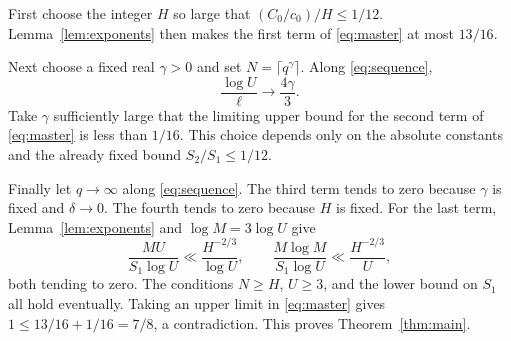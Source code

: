 \documentclass[11pt,a4paper]{amsart}
\theoremstyle{remark}
\numberwithin{equation}{section}
\begin{document}
First choose the integer $H$ so large that
$(C_0/c_0)/H\le1/12$. Lemma~\ref{lem:exponents} then makes the
first term of \eqref{eq:master} at most $13/16$.

Next choose a fixed real $\gamma>0$ and set
$N=\lceil q^\gamma\rceil$. Along \eqref{eq:sequence},
\[
 \frac{\log U}{\ell}\longrightarrow\frac{4\gamma}{3}.
\]
Take $\gamma$ sufficiently large that the limiting upper bound
for the second term of \eqref{eq:master} is less than $1/16$.
This choice depends only on the absolute constants and the already
fixed bound $S_2/S_1\le1/12$.

Finally let $q\to\infty$ along \eqref{eq:sequence}. The third term
tends to zero because $\gamma$ is fixed and $\delta\to0$.
The fourth tends to zero because $H$ is fixed. For the last term,
Lemma~\ref{lem:exponents} and $\log M=3\log U$ give
\[
 \frac{MU}{S_1\log U}\ll\frac{H^{-2/3}}{\log U},
 \qquad
 \frac{M\log M}{S_1\log U}\ll\frac{H^{-2/3}}{U},
\]
both tending to zero. The conditions $N\ge H$, $U\ge3$, and
the lower bound on $S_1$ all hold eventually. Taking an upper limit
in \eqref{eq:master} gives $1\le13/16+1/16=7/8$, a contradiction.
This proves Theorem~\ref{thm:main}.
\end{document}
